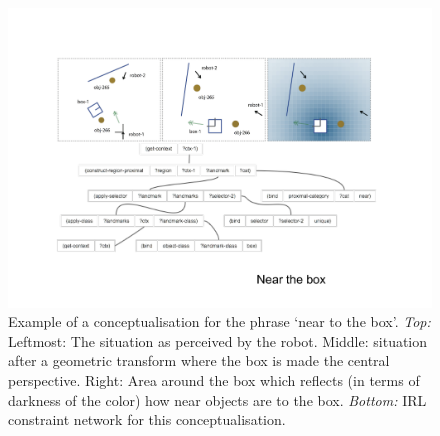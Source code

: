 \begin{figure}
\centerline{\includegraphics[width=.9\linewidth]{chap11/figs/near-the-box2.pdf}}
\caption{Example of a conceptualisation for the phrase `near to the box'. {\itshape Top:} 
Leftmost: The situation as perceived by the robot. Middle: situation after a geometric transform where the box is 
made the central perspective. Right: Area around the box which reflects (in terms of darkness of the color) how 
near objects are to the box. {\itshape Bottom:} IRL constraint network for this conceptualisation.
\label{fig:spatial-strategies}}
\end{figure}

